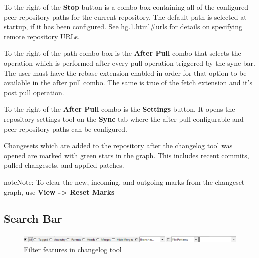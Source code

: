 \documentclass[letterpaper,10pt,english]{manual}
\begin{document}
To the right of the \textbf{Stop} button is a combo box containing
all of the configured peer repository paths for the current repository.
The default path is selected at startup, if it has been configured.
See \href{http://www.selenic.com/mercurial/hg.1.html\#urls}{hg.1.html\#urls}  for
details on specifying remote repository URLs.

To the right of the path combo box is the \textbf{After Pull} combo
that selects the operation which is performed after every pull operation
triggered by the sync bar.  The user must have the rebase extension
enabled in order for that option to be available in the after pull
combo.  The same is true of the fetch extension and it's post pull
operation.

To the right of the \textbf{After Pull} combo is the
\textbf{Settings} button.  It opens the repository settings tool on
the \textbf{Sync} tab where the after pull configurable and peer
repository paths can be configured.

Changesets which are added to the repository after the changelog tool
was opened are marked with green stars in the graph.  This includes
recent commits, pulled changesets, and applied patches.

\begin{notice}{note}{Note:}
To clear the new, incoming, and outgoing marks from the changeset
graph, use \textbf{View -\textgreater{} Reset Marks}
\end{notice}


\subsection{Search Bar}
\begin{figure}[htbp]
\centering

\includegraphics{searchbar.png}
\caption{Filter features in changelog tool}\end{figure}
\end{document}
